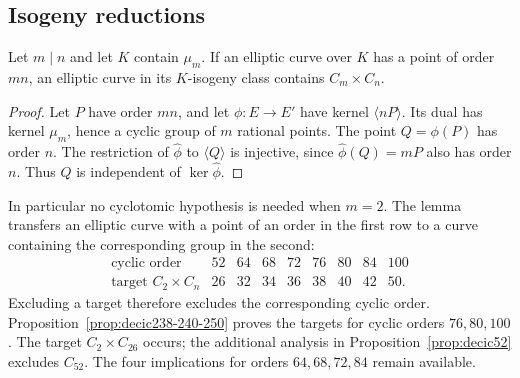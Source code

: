 \subsection{Isogeny reductions}
\begin{lemma}\label{lem:decic-isogeny-transfer}
Let $m\mid n$ and let $K$ contain $\mu_m$.
If an elliptic curve over $K$ has a point of order $mn$, an elliptic
curve in its $K$-isogeny class contains $C_m\times C_n$.
\end{lemma}
\begin{proof}
Let $P$ have order $mn$, and let $\phi:E\to E'$ have kernel
$\langle nP\rangle$. Its dual has kernel $\mu_m$, hence a cyclic
group of $m$ rational points. The point $Q=\phi(P)$ has order $n$.
The restriction of $\widehat\phi$ to $\langle Q\rangle$ is
injective, since $\widehat\phi(Q)=mP$ also has order $n$.
Thus $Q$ is independent of $\ker\widehat\phi$.
\end{proof}
In particular no cyclotomic hypothesis is needed when $m=2$.
The lemma transfers an elliptic curve with a point of an order in the
first row to a curve containing the corresponding group in the second:
\[
\begin{array}{c|rrrrrrrr}
 \text{cyclic order}&52&64&68&72&76&80&84&100\\
 \text{target }C_2\times C_n&26&32&34&36&38&40&42&50.
\end{array}
\]
Excluding a target therefore excludes the corresponding cyclic order.
Proposition~\ref{prop:decic238-240-250} proves the targets for cyclic
orders $76,80,100$. The target $C_2\times C_{26}$ occurs; the additional
analysis in Proposition~\ref{prop:decic52} excludes $C_{52}$. The four
implications for orders $64,68,72,84$ remain available.
